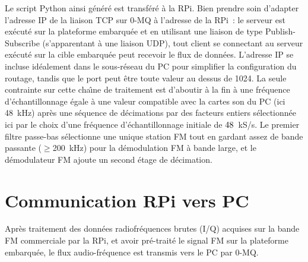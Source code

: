 \documentclass[a4paper]{article}
\begin{document}
Le script Python ainsi g\'en\'er\'e est transf\'er\'e \`a la RPi. Bien prendre soin
d'adapter l'adresse IP de la liaison TCP sur 0-MQ \`a l'adresse de la RPi~: le serveur
est ex\'ecut\'e sur la plateforme embarqu\'ee et en utilisant une liaison de type
Publish-Subscribe (s'apparentant \`a une liaison UDP), tout client se connectant au serveur
ex\'ecut\'e sur la cible embarqu\'ee peut recevoir le flux de donn\'ees. L'adresse IP
se incluse id\'ealement dans le sous-r\'eseau du PC pour simplifier la configuration
du routage, tandis que le port peut \^etre toute valeur au dessus de 1024. La seule
contrainte sur cette cha\^\i ne de traitement est d'aboutir \`a la fin \`a une 
fr\'equence d'\'echantillonnage \'egale \`a une valeur compatible avec la cartes son du
PC (ici 48~kHz) apr\`es une s\'equence de d\'ecimations par des facteurs entiers
s\'electionn\'ee ici par le choix d'une fr\'equence d'\'echantillonnage initiale de
$48\time 24$~kS/s. Le premier filtre passe-bas s\'electionne une unique station FM
tout en gardant assez de bande passante ($\geq$200~kHz) pour la d\'emodulation FM
\`a bande large, et le d\'emodulateur FM ajoute un second \'etage de d\'ecimation.

\section{Communication RPi vers PC}

Apr\`es traitement des donn\'ees radiofr\'equences brutes (I/Q) acquises sur la bande 
FM commerciale par la RPi, et avoir pr\'e-trait\'e le signal FM sur la plateforme
embarqu\'ee, le flux audio-fr\'equence est transmis vers le PC par 0-MQ.
\end{document}
